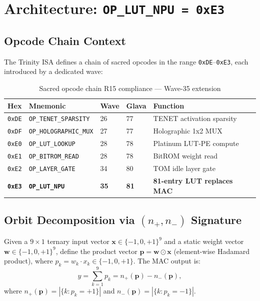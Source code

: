 \section{Architecture: \texttt{OP\_LUT\_NPU = 0xE3}}
\label{sec:architecture_opcode}

\subsection{Opcode Chain Context}

The Trinity ISA defines a chain of sacred opcodes in the range
\texttt{0xDE}--\texttt{0xE3}, each introduced by a dedicated wave:

\begin{table}[ht]
\centering
\caption{Sacred opcode chain R15 compliance — Wave-35 extension}
\label{tab:opcode_chain_w35}
\begin{tabular}{lllll}
\hline
Hex & Mnemonic & Wave & Glava & Function \\
\hline
\texttt{0xDE} & \texttt{OP\_TENET\_SPARSITY}   & 26 & 77 & TENET activation sparsity \\
\texttt{0xDF} & \texttt{OP\_HOLOGRAPHIC\_MUX}  & 27 & 77 & Holographic 1x2 MUX \\
\texttt{0xE0} & \texttt{OP\_LUT\_LOOKUP}        & 28 & 78 & Platinum LUT-PE compute \\
\texttt{0xE1} & \texttt{OP\_BITROM\_READ}        & 28 & 78 & BitROM weight read \\
\texttt{0xE2} & \texttt{OP\_LAYER\_GATE}         & 34 & 80 & TOM idle layer gate \\
\texttt{\textbf{0xE3}} & \textbf{\texttt{OP\_LUT\_NPU}} & \textbf{35} & \textbf{81} & \textbf{81-entry LUT replaces MAC} \\
\hline
\end{tabular}
\end{table}

\subsection{Orbit Decomposition via \((n_{+}, n_{-})\) Signature}

Given a $9 \times 1$ ternary input vector $\mathbf{x} \in \{-1,0,+1\}^9$ and
a static weight vector $\mathbf{w} \in \{-1,0,+1\}^9$, define the product
vector $\mathbf{p} = \mathbf{w} \odot \mathbf{x}$ (element-wise Hadamard
product), where $p_k = w_k \cdot x_k \in \{-1,0,+1\}$.  The MAC output is:
\[
  y = \sum_{k=1}^{9} p_k = n_{+}(\mathbf{p}) - n_{-}(\mathbf{p}),
\]
where $n_{+}(\mathbf{p}) = |\{k : p_k = +1\}|$ and
$n_{-}(\mathbf{p}) = |\{k : p_k = -1\}|$.

